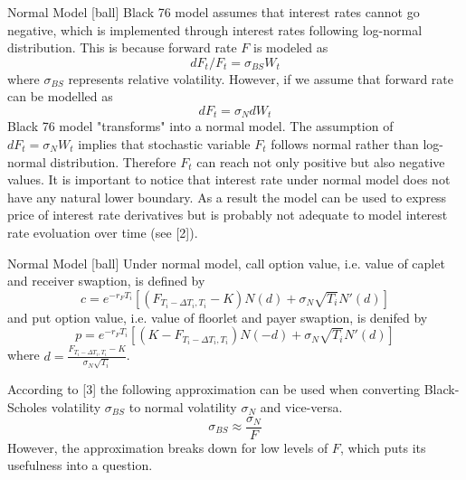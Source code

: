 \documentclass{beamer}
\begin{document}
\begin{frame}{Normal Model}
[ball]
Black 76 model assumes that interest rates cannot go negative, which is implemented through interest rates following log-normal distribution. This is because forward rate $F$ is modeled as
\begin{equation}
dF_t / F_t = \sigma_{BS}W_t
\end{equation}
where $\sigma_{BS}$ represents relative volatility. However, if we assume that forward rate can be modelled as
\begin{equation}
dF_t = \sigma_N dW_t
\end{equation}
Black 76 model "transforms" into a normal model. The assumption of $dF_t = \sigma_N W_t$ implies that stochastic variable $F_t$ follows normal rather than log-normal distribution. Therefore $F_t$ can reach not only positive but also negative values. It is important to notice that interest rate under normal model does not have any natural lower boundary. As a result the model can be used to express price of interest rate derivatives but is probably not adequate to model interest rate evoluation over time (see [2]).
\end{frame}

\begin{frame}{Normal Model}
[ball]
Under normal model, call option value, i.e. value of caplet and receiver swaption, is defined by
\begin{equation}
c = e^{-r_F T_i}[(F_{T_i - \Delta T_i, T_i} - K)N(d) + \sigma_N \sqrt{T_i}N'(d)]
\end{equation}
and put option value, i.e. value of floorlet and payer swaption, is denifed by
\begin{equation}
p = e^{-r_F T_i}[(K - F_{T_i - \Delta T_i, T_i})N(-d) + \sigma_N \sqrt{T_i}N'(d)]
\end{equation}
where $d = \frac{F_{T_i - \Delta T_i, T_i} - K}{\sigma_N \sqrt{T_i}}$.

According to [3] the following approximation can be used when converting Black-Scholes volatility $\sigma_{BS}$ to normal volatility $\sigma_N$ and vice-versa.
\begin{equation}
\sigma_{BS} \approx \frac{\sigma_N}{F}
\end{equation}
However, the approximation breaks down for low levels of $F$, which puts its usefulness into a question.
\end{frame}
\end{document}
